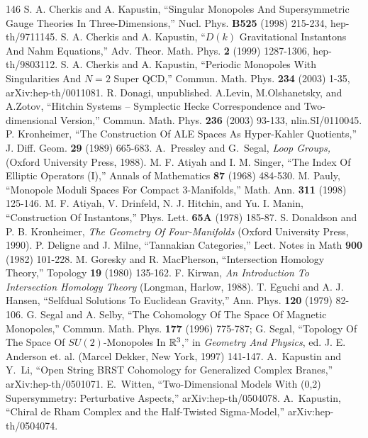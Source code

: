 \begin{thebibliography}{146}
 S. A. Cherkis and A. Kapustin, ``Singular Monopoles And Supersymmetric Gauge Theories In Three-Dimensions,'' Nucl. Phys. \textbf{B525} (1998) 215-234, hep-th/9711145.
 S. A. Cherkis and A. Kapustin, ``$D(k)$ Gravitational Instantons And Nahm Equations,'' Adv. Theor. Math. Phys. \textbf{2} (1999) 1287-1306, hep-th/9803112.
 S. A. Cherkis and A. Kapustin, ``Periodic Monopoles With Singularities And $N=2$ Super QCD,'' Commun. Math. Phys. \textbf{234} (2003) 1-35, arXiv:hep-th/0011081.
 R. Donagi, unpublished.
 A.Levin, M.Olshanetsky, and A.Zotov, ``Hitchin Systems -- Symplectic Hecke Correspondence and Two-dimensional Version,'' Commun. Math. Phys. \textbf{236} (2003) 93-133, nlin.SI/0110045.
 P. Kronheimer, ``The Construction Of ALE Spaces As Hyper-Kahler Quotients,'' J. Diff. Geom. \textbf{29} (1989) 665-683.
 A.~Pressley and G.~Segal, \emph{Loop Groups,} (Oxford University Press, 1988).
 M. F. Atiyah and I. M. Singer, ``The Index Of Elliptic Operators (I),'' Annals of Mathematics \textbf{87} (1968) 484-530.
 M. Pauly, ``Monopole Moduli Spaces For Compact 3-Manifolds,'' Math. Ann. \textbf{311} (1998) 125-146.
 M. F. Atiyah, V. Drinfeld, N. J. Hitchin, and Yu. I. Manin, ``Construction Of Instantons,'' Phys. Lett. \textbf{65A} (1978) 185-87.
 S. Donaldson and P. B. Kronheimer, \emph{The Geometry Of Four-Manifolds} (Oxford University Press, 1990).
 P. Deligne and J. Milne, ``Tannakian Categories,'' Lect. Notes in Math \textbf{900} (1982) 101-228.
 M. Goresky and R. MacPherson, ``Intersection Homology Theory,'' Topology \textbf{19} (1980) 135-162.
 F. Kirwan, \emph{An Introduction To Intersection Homology Theory} (Longman, Harlow, 1988).
 T. Eguchi and A. J. Hansen, ``Selfdual Solutions To Euclidean Gravity,'' Ann. Phys. \textbf{120} (1979) 82-106.
 G. Segal and A. Selby, ``The Cohomology Of The Space Of Magnetic Monopoles,'' Commun. Math. Phys. \textbf{177} (1996) 775-787; G. Segal, ``Topology Of The Space Of $SU(2)$-Monopoles In $\Bbb{R}^3$,'' in \emph{Geometry And Physics}, ed. J. E. Anderson et. al. (Marcel Dekker, New York, 1997) 141-147.
 A.~Kapustin and Y.~Li, ``Open String BRST Cohomology for Generalized Complex Branes,'' arXiv:hep-th/0501071.
 E.~Witten, ``Two-Dimensional Models With (0,2) Supersymmetry: Perturbative Aspects,'' arXiv:hep-th/0504078.
 A.~Kapustin, ``Chiral de Rham Complex and the Half-Twisted Sigma-Model,'' arXiv:hep-th/0504074.

\end{thebibliography}

